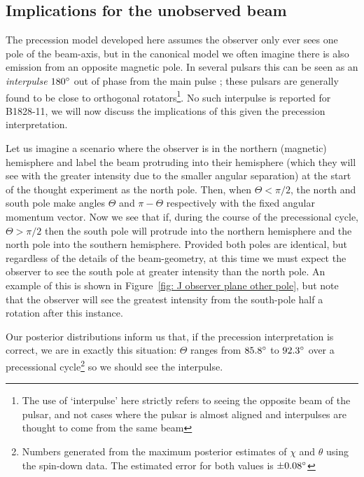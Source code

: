 \documentclass[../full_thesis/full_thesis.tex]{subfiles}
\begin{document}
\begin{subappendices}
\section{Implications for the unobserved beam}
\label{sec: implications for the unobserved beam}
The precession model developed here assumes the observer only ever sees one
pole of the beam-axis, but in the canonical model we often imagine there is
also emission from an opposite magnetic pole. In several pulsars this can be
seen as an \emph{interpulse} $180^{\circ}$ out of phase from the main pulse
\citep{Lyne1988, Maciesiak2011}; these pulsars are generally found to be close
to orthogonal rotators\footnote{The use of `interpulse' here strictly refers to
seeing the opposite beam of the pulsar, and not cases where the pulsar is
almost aligned and interpulses are thought to come from the same beam}. No
such interpulse is reported for B1828-11, we will now discuss the implications
of this given the precession interpretation.

Let us imagine a scenario where the observer is in the northern (magnetic)
hemisphere and label the beam protruding into their hemisphere (which they will
see with the greater intensity due to the smaller angular separation) at the
start of the thought experiment as the north pole.  Then, when $\Theta < \pi/2$,
the north and south
pole make angles $\Theta$ and $\pi-\Theta$ respectively with the fixed angular
momentum vector. Now we see that if, during the course of the precessional
cycle, $\Theta > \pi/2$ then the south pole will protrude into the northern
hemisphere and the north pole into the southern hemisphere. Provided both poles
are identical, but regardless of the details of the beam-geometry, at this time
we must expect the observer to see the south pole at greater intensity than the
north pole. An example of this is shown in Figure~\ref{fig: J observer plane
other pole}, but note that the observer will see the greatest intensity from
the south-pole half a rotation after this instance.

Our posterior distributions inform us that, if the precession interpretation is
correct, we are in exactly this situation: $\Theta$ ranges from $85.8^{\circ}$
to $92.3^{\circ}$ over a precessional cycle\footnote{Numbers generated from the
maximum posterior estimates of $\chi$ and $\theta$ using the spin-down data.
The estimated error for both values is $\pm0.08^{\circ}$} so we should see the
interpulse.


\end{subappendices}
\end{document}
